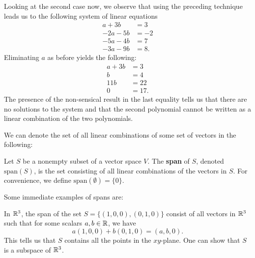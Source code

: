 \begin{eg}
    Looking at the second case now, we observe that using the preceding technique leads us to the following system of linear equations
    \begin{align*}
        a + 3b &= 3  \\
        -2a - 5b &= -2 \\
        -5a - 4b &= 7  \\
        -3a - 9b &= 8. 
    \end{align*}
    Eliminating \( a  \) as before yields the following:
    \begin{align*}
        a + 3b &= 3  \\
        b &= 4  \\
        11b &= 22 \\ 
        0 &= 17.
    \end{align*}
    The presence of the non-sensical result in the last equality tells us that there are no solutions to the system and that the second polynomial cannot be written as a linear combination of the two polynomials.
\end{eg}

We can denote the set of all linear combinations of some set of vectors in the following:

\begin{definition}[Span]
    Let \( S  \) be a nonempty subset of a vector space \( V  \). The \textbf{span} of \( S  \), denoted \( \text{span}(S) \), is the set consisting of all linear combinations of the vectors in \( S  \). For convenience, we define \( \text{span}(\emptyset) = \{ 0  \}  \). 
\end{definition}

Some immediate examples of spans are:
\begin{eg}
      In \( \mathbb{R}^{3}   \), the span of the set \( S =  \{ (1,0,0) , (0,1,0)  \}  \) consist of all vectors in \( \mathbb{R}^{3}  \) such that for some scalars \( a,b \in \mathbb{R}  \), we have 
        \[  a(1,0,0) + b (0,1,0) = (a,b , 0). \]
        This tells us that \( S  \) contains all the points in the \( xy \)-plane. One can show that \( S  \) is a subspace of \( \mathbb{R}^{3} \).
\end{eg}

